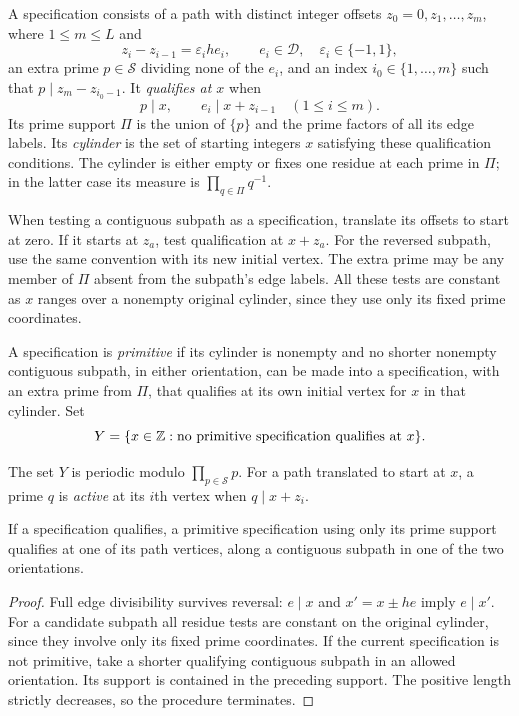 \begin{definition}\label{def:primitive-specification}
A specification consists of a path with distinct integer offsets
$z_0=0,z_1,\ldots,z_m$, where $1\le m\le L$ and
\[
 z_i-z_{i-1}=\varepsilon_i h e_i,
 \qquad e_i\in\mathcal D,\quad \varepsilon_i\in\{-1,1\},
\]
an extra prime $p\in\mathcal S$ dividing none of the $e_i$, and an
index $i_0\in\{1,\ldots,m\}$ such that
$p\mid z_m-z_{i_0-1}$.  It \emph{qualifies at $x$} when
\[
 p\mid x,\qquad e_i\mid x+z_{i-1}\quad(1\le i\le m).
\]
Its prime support $\Pi$ is the union of $\{p\}$ and the prime factors
of all its edge labels.  Its \emph{cylinder} is the set of starting
integers $x$ satisfying these qualification conditions.  The cylinder
is either empty or fixes one residue at each prime in $\Pi$; in the
latter case its measure is $\prod_{q\in\Pi}q^{-1}$.

When testing a contiguous subpath as a specification, translate its
offsets to start at zero.  If it starts at $z_a$, test qualification
at $x+z_a$.  For the
reversed subpath, use the same convention with its new initial
vertex.  The extra prime may be any member of $\Pi$ absent from the
subpath's edge labels.  All these tests are constant as $x$ ranges
over a nonempty original cylinder, since they use only its fixed
prime coordinates.

A specification is \emph{primitive} if its cylinder is nonempty and
no shorter nonempty contiguous subpath, in either orientation, can
be made into a specification, with an extra prime from $\Pi$, that
qualifies at its own initial vertex for $x$ in that cylinder.  Set
\[
 Y=\{x\in\mathbb Z:\text{no primitive specification qualifies at }x\}.
\]
\end{definition}

The set $Y$ is periodic modulo $\prod_{p\in\mathcal S}p$.
For a path translated to start at $x$, a prime $q$ is \emph{active}
at its $i$th vertex when $q\mid x+z_i$.

\begin{lemma}\label{lem:primitive-descent}
If a specification qualifies, a primitive specification using only
its prime support qualifies at one of its path vertices, along a
contiguous subpath in one of the two orientations.
\end{lemma}

\begin{proof}
Full edge divisibility survives reversal: $e\mid x$ and
$x'=x\pm he$ imply $e\mid x'$.  For a candidate subpath all residue
tests are constant on the original cylinder, since they involve only
its fixed prime coordinates.  If the current specification is not
primitive, take a shorter qualifying contiguous subpath in an allowed
orientation.  Its support is contained in the preceding support.
The positive length strictly decreases, so the procedure terminates.
\end{proof}

